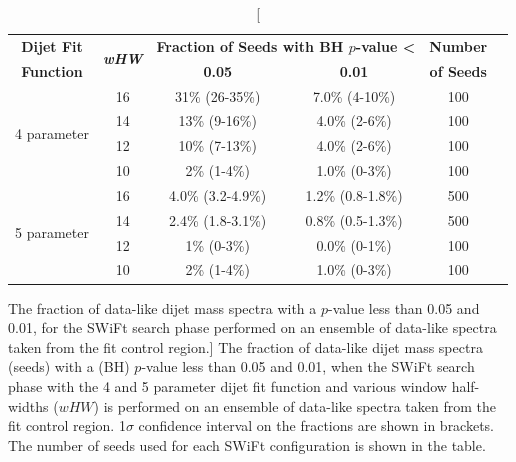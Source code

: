\begin{table}[!htb]
\centering
\begin{tabular}{|c|c||c|c|c|c|}
  \hline
   \textbf{Dijet Fit}  & \multirow{2}{*}{\textbf{\textit{wHW}}} &\multicolumn{2}{c|}{\textbf{Fraction of Seeds with BH \mbox{$p$-value} \textless}} &   \textbf{Number}   \\ \cline{3-4} 
   \textbf{Function}   &                        & \textbf{0.05}                & \textbf{0.01}                                               &  \textbf{of Seeds}  \\ 
  \hline
  \multirow{4}{*}{4 parameter} &   16 &  31\%   (26-35\%)   &  7.0\% (4-10\%)  & 100  \\
   &   14 &  13\%   (9-16\%)    &  4.0\% (2-6\%)   & 100  \\
   &   12 &  10\%   (7-13\%)    &  4.0\% (2-6\%)   & 100  \\
   &   10 &  2\%   (1-4\%)      &  1.0\% (0-3\%)   & 100  \\
  \hline
  \multirow{4}{*}{5 parameter} &   16 &  4.0\% (3.2-4.9\%)  &  1.2\% (0.8-1.8\%) & 500  \\
  &   14 &  2.4\% (1.8-3.1\%)  &  0.8\% (0.5-1.3\%) & 500  \\
  &   12 &  1\%   (0-3\%)      &  0.0\%  (0-1\%)  & 100  \\
  &   10 &  2\%   (1-4\%)      &  1.0\%  (0-3\%)  & 100  \\
  \hline
\end{tabular}
\caption
    [ The fraction of data-like dijet mass spectra
      with a \bh{} \mbox{$p$-value} less than 0.05 and 0.01,
      for the SWiFt search phase performed on an ensemble of data-like spectra
      taken from the \lm{} fit control region.]
    {\label{tab:bumpH_lm_spuriousSignal}
      The fraction of data-like dijet mass spectra (seeds) 
      with a \bh{} (BH) \mbox{$p$-value} less than 0.05 and 0.01,
      when the SWiFt search phase with the 4 and 5 parameter dijet fit function
      and various window half-widths ($wHW$) is performed on an ensemble of data-like spectra
      taken from the \lm{} fit control region.
      1$\sigma$ confidence interval on the fractions are shown in brackets.
      The number of seeds used for each SWiFt configuration is shown in the table.}
    \vspace{-0.5em}
\end{table}

